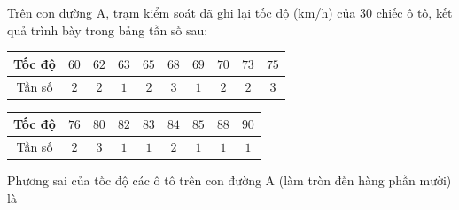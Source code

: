 \begin{ex}
Trên con đường A, trạm kiểm soát đã ghi lại tốc độ (km/h) của $30$ chiếc ô tô, kết quả trình bày trong bảng tần số sau:
\begin{center}
\begin{tabular}{|c|c|c|c|c|c|c|c|c|c|}\hline
Tốc độ & $60$ & $62$ & $63$ & $65$ & $68$ & $69$ & $70$ & $73$ & $75$\\\hline
Tần số & $2$ & $2$ & $1$ & $2$ & $3$ & $1$ & $2$ & $2$ & $3$\\\hline
\end{tabular}
\end{center}
\begin{center}
\begin{tabular}{|c|c|c|c|c|c|c|c|c|}\hline
Tốc độ & $76$ & $80$ & $82$ & $83$ & $84$ & $85$ & $88$ & $90$\\\hline
Tần số & $2$ & $3$ & $1$ & $1$ & $2$ & $1$ & $1$ & $1$\\\hline
\end{tabular}
\end{center}
Phương sai của tốc độ các ô tô trên con đường A (làm tròn đến hàng phần mười) là
\end{ex}
